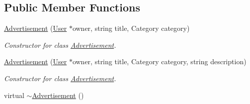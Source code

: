 \subsection*{Public Member Functions}
\begin{DoxyCompactItemize}
\item 
\hyperlink{class_advertisement_a3819a25a48afbca0a6da6717ef0d6da3}{Advertisement} (\hyperlink{class_user}{User} $\ast$owner, string title, Category category)
\begin{DoxyCompactList}\small\item\em Constructor for class \hyperlink{class_advertisement}{Advertisement}. \end{DoxyCompactList}\item 
\hyperlink{class_advertisement_a343d31bb9f21892718fc4a756f7eb05c}{Advertisement} (\hyperlink{class_user}{User} $\ast$owner, string title, Category category, string description)
\begin{DoxyCompactList}\small\item\em Constructor for class \hyperlink{class_advertisement}{Advertisement}. \end{DoxyCompactList}\item 
\hypertarget{class_advertisement_a49170a22dcd2a8bf88d3ed1aad475b82}{}virtual \hyperlink{class_advertisement_a49170a22dcd2a8bf88d3ed1aad475b82}{$\sim$\+Advertisement} ()\label{class_advertisement_a49170a22dcd2a8bf88d3ed1aad475b82}


\end{DoxyCompactItemize}
